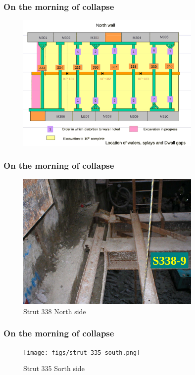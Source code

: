 \documentclass[notes]{beamer}
\begin{document}
\begin{frame}
\frametitle{On the morning of collapse}
\begin{figure}[ht]
	\centering
	\includegraphics[width=0.8\textwidth]{figs/splays-dwall-gaps.png}
\end{figure}
\end{frame}

\begin{frame}
\frametitle{On the morning of collapse}
\begin{figure}[ht]
	\centering
	\includegraphics[width=0.8\textwidth]{figs/strut-338.png}
	\caption*{Strut 338 North side}
\end{figure}
\end{frame}

\begin{frame}
\frametitle{On the morning of collapse}
\begin{figure}[ht]
	\centering
	\texttt{[image: figs/strut-335-south.png]}
	\caption*{Strut 335 Sorth side}
\end{figure}
\end{frame}
\end{document}
